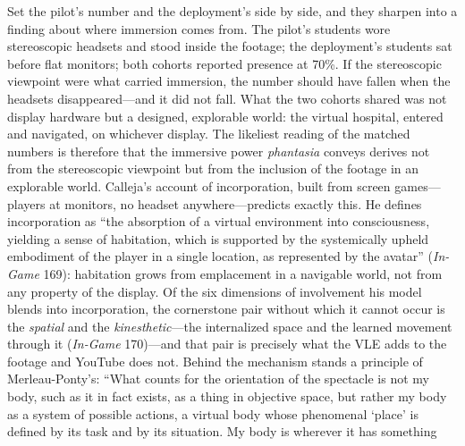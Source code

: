 Set the pilot's number and the deployment's side by side, and they
sharpen into a finding about where immersion comes from. The pilot's
students wore stereoscopic headsets and stood inside the footage; the
deployment's students sat before flat monitors; both cohorts reported
presence at 70\%. If the stereoscopic viewpoint were what
carried immersion, the number should have fallen when the headsets
disappeared---and it did not fall. What the two cohorts shared was not
display hardware but a designed, explorable world: the virtual
hospital, entered and navigated, on whichever display. The likeliest
reading of the matched numbers is therefore that the immersive power
\textit{phantasia} conveys derives not from the stereoscopic viewpoint
but from the inclusion of the footage in an explorable world. Calleja's
account of incorporation, built from screen games---players at
monitors, no headset anywhere---predicts exactly this. He defines
incorporation as ``the absorption of a virtual environment into
consciousness, yielding a sense of habitation, which is supported by
the systemically upheld embodiment of the player in a single location,
as represented by the avatar'' (\textit{In-Game} 169): habitation grows
from emplacement in a navigable world, not from any property of the
display. Of the six dimensions of involvement his model blends into
incorporation, the cornerstone pair without which it cannot occur is
the \textit{spatial} and the \textit{kinesthetic}---the internalized
space and the learned movement through it (\textit{In-Game} 170)---and
that pair is
precisely what the VLE adds to the footage and YouTube does not. Behind
the mechanism stands a principle of Merleau-Ponty's: ``What counts for
the orientation of the spectacle is not my body, such as it in fact
exists, as a thing in objective space, but rather my body as a system
of possible actions, a virtual body whose phenomenal `place' is defined
by its task and by its situation. My body is wherever it has something
